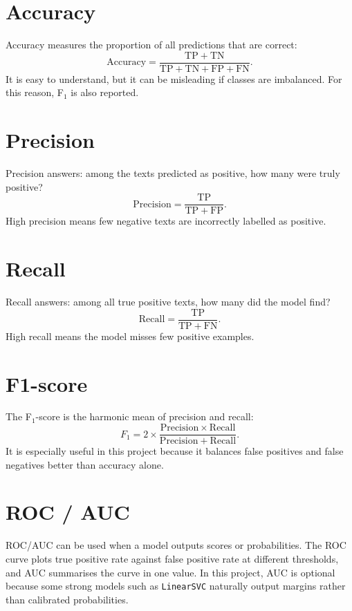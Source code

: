 \documentclass[11pt,a4paper]{report}
\begin{document}
\section{Accuracy}

Accuracy measures the proportion of all predictions that are correct:
\[
    \mathrm{Accuracy} = \frac{\mathrm{TP} + \mathrm{TN}}{\mathrm{TP} + \mathrm{TN} + \mathrm{FP} + \mathrm{FN}}.
\]
It is easy to understand, but it can be misleading if classes are imbalanced. For this reason, F$_1$ is also reported.

\section{Precision}

Precision answers: among the texts predicted as positive, how many were truly positive?
\[
    \mathrm{Precision} = \frac{\mathrm{TP}}{\mathrm{TP} + \mathrm{FP}}.
\]
High precision means few negative texts are incorrectly labelled as positive.

\section{Recall}

Recall answers: among all true positive texts, how many did the model find?
\[
    \mathrm{Recall} = \frac{\mathrm{TP}}{\mathrm{TP} + \mathrm{FN}}.
\]
High recall means the model misses few positive examples.

\section{F1-score}

The F$_1$-score is the harmonic mean of precision and recall:
\[
    F_1 = 2 \times \frac{\mathrm{Precision} \times \mathrm{Recall}}{\mathrm{Precision} + \mathrm{Recall}}.
\]
It is especially useful in this project because it balances false positives and false negatives better than accuracy alone.

\section{ROC / AUC}

ROC/AUC can be used when a model outputs scores or probabilities. The ROC curve plots true positive rate against false positive rate at different thresholds, and AUC summarises the curve in one value. In this project, AUC is optional because some strong models such as \texttt{LinearSVC} naturally output margins rather than calibrated probabilities.
\end{document}
